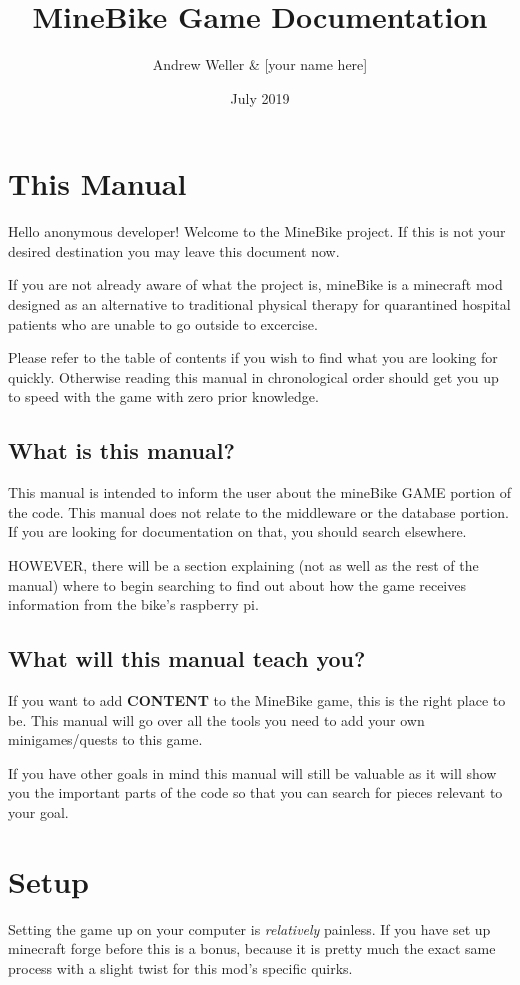 \documentclass[12pt]{article}
\title{MineBike Game Documentation}
\author{Andrew Weller \& [your name here]}
\date{July 2019}
\begin{document}
\maketitle

\tableofcontents

\section{This Manual}
Hello anonymous developer! Welcome to the MineBike project. If this is not your desired destination you may leave this document now.

If you are not already aware of what the project is, mineBike is a minecraft mod designed as an alternative to traditional physical therapy for quarantined hospital patients who are unable to go outside to excercise. 

Please refer to the table of contents if you wish to find what you are looking for quickly. Otherwise reading this manual in chronological order should get you up to speed with the game with zero prior knowledge.

\subsection{What is this manual?}

This manual is intended to inform the user about the mineBike GAME portion of the code. This manual does not relate to the middleware or the database portion.
If you are looking for documentation on that, you should search elsewhere. 

HOWEVER, there will be a section explaining (not as well as the rest of the manual) where to begin searching to find out about how the game receives information from the bike's raspberry pi.

\subsection {What will this manual teach you?}

If you want to add {\bfseries CONTENT} to the MineBike game, this is the right place to be. This manual will go over all the tools you need to add your own minigames/quests to this game.

If you have other goals in mind this manual will still be valuable as it will show you the important parts of the code so that you can search for pieces relevant to your goal.

\section {Setup}
Setting the game up on your computer is \emph {relatively} painless. If you have set up minecraft forge before this is a bonus, because it is pretty much the exact same process with a slight twist for this mod's specific quirks.
\end{document}
